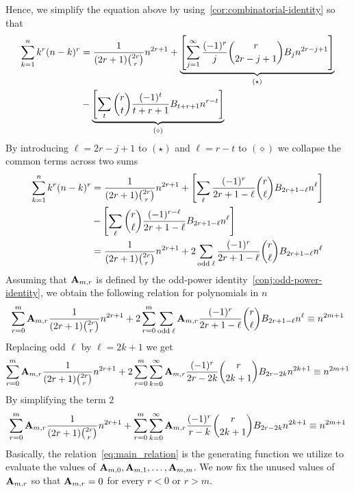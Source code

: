 Hence, we simplify the equation above by using~\eqref{cor:combinatorial-identity} so that
\begin{equation*}
    \begin{split}
        \sum_{k=1}^{n} k^{r} (n-k)^{r}
        &= \frac{1}{(2r+1) \binom{2r}r} n^{2r+1}
        + \underbrace{\left[ \sum_{j = 1}^{\infty} \frac{(-1)^r}{j} \binom{r}{2r-j+1} {B}\sb{j} n^{2r-j+1} \right]}_{(\star)} \\
        &- \underbrace{\left[ \sum_{t} \binom{r}{t} \frac{(-1)^t}{t+r+1} {B}\sb{t+r+1} n^{r-t} \right]}_{(\diamond)}
    \end{split}
\end{equation*}
By introducing $\ell=2r-j+1$ to $(\star)$ and $\ell=r-t$ to $(\diamond)$
we collapse the common terms across two sums
\begin{equation*}
    \begin{split}
        \sum_{k=1}^{n} k^{r} (n-k)^{r}
        &= \frac{1}{(2r+1) \binom{2r}r} n^{2r+1}
        + \left[ \sum_{\ell} \frac{(-1)^r}{2r+1-\ell} \binom{r}{\ell} {B}\sb{2r+1-\ell} n^{\ell} \right] \\
        &- \left[ \sum_{\ell} \binom{r}{\ell} \frac{(-1)^{r-\ell}}{2r+1-\ell} {B}\sb{2r+1-\ell} n^{\ell} \right]\\
        &= \frac{1}{(2r+1) \binom{2r}r} n^{2r+1} + 2 \sum_{\mathrm{odd \; \ell}} \frac{(-1)^r}{2r+1-\ell} \binom{r}{\ell} {B}\sb{2r+1-\ell} n^{\ell}
    \end{split}
\end{equation*}
Assuming that ${\mathbf{A}} \sb{m,r}$ is defined by the odd-power identity~\eqref{conj:odd-power-identity},
we obtain the following relation for polynomials in $n$
\begin{equation*}
    \sum_{r=0}^{m} {\mathbf{A}} \sb{m,r} \frac{1}{(2r+1) \binom{2r}r} n^{2r+1}
    + 2 \sum_{r=0}^{m} \sum_{\mathrm{odd \; \ell}} {\mathbf{A}} \sb{m,r} \frac{(-1)^r}{2r+1-\ell} \binom{r}{\ell} {B}\sb{2r+1-\ell} n^{\ell}
    \equiv n^{2m+1}
\end{equation*}
Replacing odd $\ell$ by $\ell = 2k+1$ we get
\begin{align*}
    \sum_{r=0}^{m} {\mathbf{A}} \sb{m,r} \frac{1}{(2r+1) \binom{2r}{r}} n^{2r+1} + 2 \sum_{r=0}^{m} \sum_{k=0}^{\infty} {\mathbf{A}} \sb{m,r} \frac{(-1)^r}{2r-2k} \binom{r}{2k+1} {B}\sb{2r-2k} n^{2k+1}  \equiv n^{2m+1}
\end{align*}
By simplifying the term $2$
\begin{align}
    \label{eq:main_relation}
    \sum_{r=0}^{m} {\mathbf{A}} \sb{m,r} \frac{1}{(2r+1) \binom{2r}{r}} n^{2r+1} + \sum_{r=0}^{m} \sum_{k=0}^{\infty} {\mathbf{A}} \sb{m,r} \frac{(-1)^r}{r-k} \binom{r}{2k+1} {B}\sb{2r-2k} n^{2k+1}  \equiv n^{2m+1}
\end{align}
Basically, the relation~\eqref{eq:main_relation} is the generating function we utilize to
evaluate the values of ${\mathbf{A}} \sb{m,0}, {\mathbf{A}} \sb{m,1}, \ldots, {\mathbf{A}} \sb{m,m}$.
We now fix the unused values of ${\mathbf{A}} \sb{m,r}$ so that ${\mathbf{A}} \sb{m,r} = 0$ for every $r < 0$ or $r > m$.

